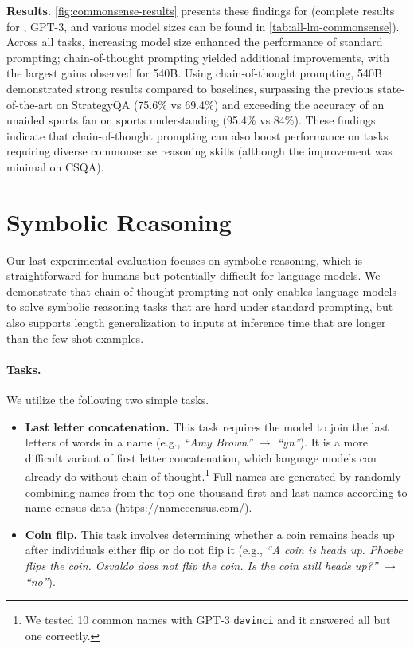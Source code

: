 \textbf{Results.}
\cref{fig:commonsense-results} presents these findings for \palm{} (complete results for \lamda{}, GPT-3, and various model sizes can be found in \cref{tab:all-lm-commonsense}).
Across all tasks, increasing model size enhanced the performance of standard prompting; chain-of-thought prompting yielded additional improvements, with the largest gains observed for \palm{} 540B. Using chain-of-thought prompting, \palm{} 540B demonstrated strong results compared to baselines, surpassing the previous state-of-the-art on StrategyQA (75.6\% vs 69.4\%) and exceeding the accuracy of an unaided sports fan on sports understanding (95.4\% vs 84\%).
These findings indicate that chain-of-thought prompting can also boost performance on tasks requiring diverse commonsense reasoning skills (although the improvement was minimal on CSQA).




\section{Symbolic Reasoning}\label{sec:symbolic-reasoning}
Our last experimental evaluation focuses on symbolic reasoning, which is straightforward for humans but potentially difficult for language models. We demonstrate that chain-of-thought prompting not only enables language models to solve symbolic reasoning tasks that are hard under standard prompting, but also supports length generalization to inputs at inference time that are longer than the few-shot examples.

\paragraph{Tasks.}
We utilize the following two simple tasks.

\begin{itemize}[leftmargin=*,topsep=0pt]
    \itemsep0em \item \textbf{Last letter concatenation.} This task requires the model to join the last letters of words in a name (e.g., \textit{``Amy Brown''} $\rightarrow$ \textit{``yn''}).
    It is a more difficult variant of first letter concatenation, which language models can already do without chain of thought.\footnote{We tested 10 common names with GPT-3 \texttt{davinci} and it answered all but one correctly.} Full names are generated by randomly combining names from the top one-thousand first and last names according to name census data ({\small{\url{https://namecensus.com/}}}).
    \item \textbf{Coin flip.} This task involves determining whether a coin remains heads up after individuals either flip or do not flip it (e.g., \textit{``A coin is heads up. Phoebe flips the coin. Osvaldo does not flip the coin. Is the coin still heads up?''} $\rightarrow$ \textit{``no''}).
\end{itemize}

